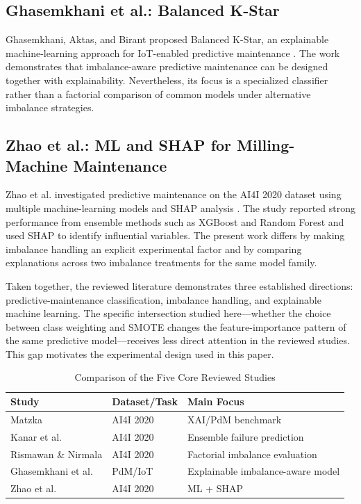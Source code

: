 \documentclass[conference]{IEEEtran}
\begin{document}
\subsection{Ghasemkhani et al.: Balanced K-Star}

Ghasemkhani, Aktas, and Birant proposed Balanced K-Star, an explainable machine-learning approach for IoT-enabled predictive maintenance \cite{ghasemkhani2023balanced}. The work demonstrates that imbalance-aware predictive maintenance can be designed together with explainability. Nevertheless, its focus is a specialized classifier rather than a factorial comparison of common models under alternative imbalance strategies.

\subsection{Zhao et al.: ML and SHAP for Milling-Machine Maintenance}

Zhao et al. investigated predictive maintenance on the AI4I 2020 dataset using multiple machine-learning models and SHAP analysis \cite{zhao2025research}. The study reported strong performance from ensemble methods such as XGBoost and Random Forest and used SHAP to identify influential variables. The present work differs by making imbalance handling an explicit experimental factor and by comparing explanations across two imbalance treatments for the same model family.

Taken together, the reviewed literature demonstrates three established directions: predictive-maintenance classification, imbalance handling, and explainable machine learning. The specific intersection studied here---whether the choice between class weighting and SMOTE changes the feature-importance pattern of the same predictive model---receives less direct attention in the reviewed studies. This gap motivates the experimental design used in this paper.

\begin{table}[h]
\centering
\caption{Comparison of the Five Core Reviewed Studies}
\label{tab:literature}
\small
\begin{tabularx}{\columnwidth}{|l|l|X|}
\hline
\textbf{Study} & \textbf{Dataset/Task} & \textbf{Main Focus} \\
\hline
Matzka \cite{matzka2020explainable} & AI4I 2020 & XAI/PdM benchmark \\
\hline
Kanar et al. \cite{kanar2022ensemble} & AI4I 2020 & Ensemble failure prediction \\
\hline
Rismawan \& Nirmala \cite{rismawan2026imbalance} & AI4I 2020 & Factorial imbalance evaluation \\
\hline
Ghasemkhani et al. \cite{ghasemkhani2023balanced} & PdM/IoT & Explainable imbalance-aware model \\
\hline
Zhao et al. \cite{zhao2025research} & AI4I 2020 & ML + SHAP \\
\hline
\end{tabularx}
\end{table}
\end{document}
